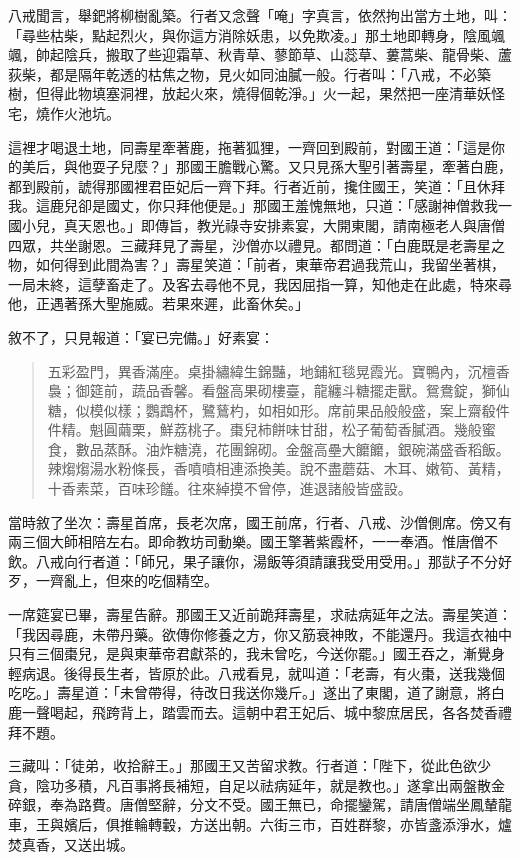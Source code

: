 八戒聞言，舉鈀將柳樹亂築。行者又念聲「唵」字真言，依然拘出當方土地，叫：「尋些枯柴，點起烈火，與你這方消除妖患，以免欺凌。」那土地即轉身，陰風颯颯，帥起陰兵，搬取了些迎霜草、秋青草、蓼節草、山蕊草、蔞蒿柴、龍骨柴、蘆荻柴，都是隔年乾透的枯焦之物，見火如同油膩一般。行者叫：「八戒，不必築樹，但得此物填塞洞裡，放起火來，燒得個乾淨。」火一起，果然把一座清華妖怪宅，燒作火池坑。

這裡才喝退土地，同壽星牽著鹿，拖著狐狸，一齊回到殿前，對國王道：「這是你的美后，與他耍子兒麼？」那國王膽戰心驚。又只見孫大聖引著壽星，牽著白鹿，都到殿前，諕得那國裡君臣妃后一齊下拜。行者近前，攙住國王，笑道：「且休拜我。這鹿兒卻是國丈，你只拜他便是。」那國王羞愧無地，只道：「感謝神僧救我一國小兒，真天恩也。」即傳旨，教光祿寺安排素宴，大開東閣，請南極老人與唐僧四眾，共坐謝恩。三藏拜見了壽星，沙僧亦以禮見。都問道：「白鹿既是老壽星之物，如何得到此間為害？」壽星笑道：「前者，東華帝君過我荒山，我留坐著棋，一局未終，這孽畜走了。及客去尋他不見，我因屈指一算，知他走在此處，特來尋他，正遇著孫大聖施威。若果來遲，此畜休矣。」

敘不了，只見報道：「宴已完備。」好素宴：
\begin{quote}
五彩盈門，異香滿座。桌掛繡緯生錦豔，地鋪紅毯晃霞光。寶鴨內，沉檀香裊；御筵前，蔬品香馨。看盤高果砌樓臺，龍纏斗糖擺走獸。鴛鴦錠，獅仙糖，似模似樣；鸚鵡杯，鷺鶿杓，如相如形。席前果品般般盛，案上齋殽件件精。魁圓繭栗，鮮荔桃子。棗兒柿餅味甘甜，松子葡萄香膩酒。幾般蜜食，數品蒸酥。油炸糖澆，花團錦砌。金盤高壘大饝饝，銀碗滿盛香稻飯。辣煼煼湯水粉條長，香噴噴相連添換美。說不盡蘑菇、木耳、嫩筍、黃精，十香素菜，百味珍饈。往來綽摸不曾停，進退諸般皆盛設。
\end{quote}

當時敘了坐次：壽星首席，長老次席，國王前席，行者、八戒、沙僧側席。傍又有兩三個大師相陪左右。即命教坊司動樂。國王擎著紫霞杯，一一奉酒。惟唐僧不飲。八戒向行者道：「師兄，果子讓你，湯飯等須請讓我受用受用。」那獃子不分好歹，一齊亂上，但來的吃個精空。

一席筵宴已畢，壽星告辭。那國王又近前跪拜壽星，求祛病延年之法。壽星笑道：「我因尋鹿，未帶丹藥。欲傳你修養之方，你又筋衰神敗，不能還丹。我這衣袖中只有三個棗兒，是與東華帝君獻茶的，我未曾吃，今送你罷。」國王吞之，漸覺身輕病退。後得長生者，皆原於此。八戒看見，就叫道：「老壽，有火棗，送我幾個吃吃。」壽星道：「未曾帶得，待改日我送你幾斤。」遂出了東閣，道了謝意，將白鹿一聲喝起，飛跨背上，踏雲而去。這朝中君王妃后、城中黎庶居民，各各焚香禮拜不題。

三藏叫：「徒弟，收拾辭王。」那國王又苦留求教。行者道：「陛下，從此色欲少貪，陰功多積，凡百事將長補短，自足以祛病延年，就是教也。」遂拿出兩盤散金碎銀，奉為路費。唐僧堅辭，分文不受。國王無已，命擺鑾駕，請唐僧端坐鳳輦龍車，王與嬪后，俱推輪轉轂，方送出朝。六街三市，百姓群黎，亦皆盞添淨水，爐焚真香，又送出城。

